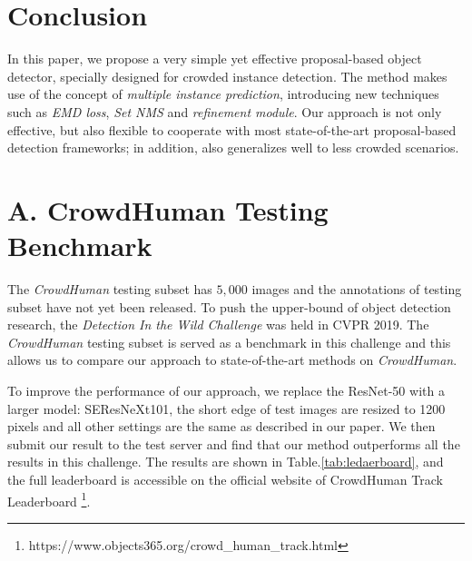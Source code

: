 \documentclass[10pt,twocolumn,letterpaper]{article}
\begin{document}
\section{Conclusion}
In this paper, we propose a very simple yet effective proposal-based object detector, specially designed for crowded instance detection. The method makes use of the concept of \emph{multiple instance prediction}, introducing new techniques such as \emph{EMD loss}, \emph{Set NMS} and \emph{refinement module}. Our approach is not only effective, but also flexible to cooperate with most state-of-the-art proposal-based detection frameworks; in addition, also generalizes well to less crowded scenarios. 

{\small


}

\newpage
\section*{A. CrowdHuman Testing Benchmark}
The \emph{CrowdHuman}\cite{shao2018crowdhuman} testing subset has $5, 000$ images and the 
annotations of testing subset have not yet been released.
To push the upper-bound of object detection research,
the \emph{Detection In the Wild Challenge} was held in CVPR 2019.
The \emph{CrowdHuman} testing subset is served as a benchmark in this challenge and 
this allows us to compare our approach to state-of-the-art 
methods on \emph{CrowdHuman}.

To improve the performance of our approach, we replace the 
ResNet-50\cite{he2016deep} with a larger model: SEResNeXt101\cite{hu2018squeeze,xie2017aggregated}, 
the short edge of test images are resized to 1200 pixels
and all other settings are the same as described in our paper. 
We then submit our result to the test server and find that our method outperforms 
all the results in this challenge.
The results are shown in Table.\ref{tab:ledaerboard}, and the full leaderboard 
is accessible on the official website of CrowdHuman Track Leaderboard
\footnote{https://www.objects365.org/crowd\_human\_track.html}.
\end{document}
